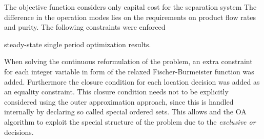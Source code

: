     The objective function considers only capital cost for the separation system
    The difference in the operation modes lies on the requirements on product flow rates and purity. The following 
    constraints were enforced  
    \begin{table}
        \center
        \footnotesize
        
        \caption{steady-state single period optimization results.}
        \label{tab:ss1_results}
    \end{table}
    When solving the continuous reformulation of the problem, an extra constraint for each integer variable in form of the
    relaxed Fischer-Burmeister function was added. Furthermore the closure condition for each location decision was added as
    an equality constraint. This closure condition needs not to be explicitly considered using the outer approximation approach,
    since this is handled internally by declaring so called special ordered sets. This allows \gproms and the OA algorithm
    to exploit the special structure of the problem due to the \emph{exclusive or} decisions.

